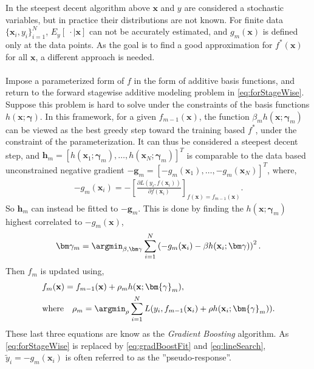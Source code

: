 In the steepest decent algorithm above $\mathbf{x}$ and $y$ are considered a stochastic variables, but in practice their distributions are not known. For finite data $\{\mathbf{x}_i, y_i\}_{i = 1}^{N}$, $E_y \left[\: \cdot \mid \mathbf{x} \right]$ can not be accurately estimated, and $g_m(\mathbf{x})$ is defined only at the data points. As the goal is to find a good approximation for $f^*(\mathbf{x})$ for all $\mathbf{x}$, a different approach is needed. 
\\
\\
Impose a parameterized form of $f$ in the form of additive basis functions, and return to the forward stagewise additive modeling problem in \eqref{eq:forStageWise}. Suppose this problem is hard to solve under the constraints of the basis functions $h(\mathbf{x}; \bm \gamma)$.
In this framework, for a given $f_{m-1}(\mathbf{x})$, the function $\beta_m h(\mathbf{x}; \bm{\gamma}_m)$ can be viewed as the best greedy step toward the training based $f^*$, under the constraint of the parameterization. It can thus be considered a steepest decent step, and $\mathbf{h}_m = [h(\mathbf{x}_1; \bm\gamma_m), \ldots, h(\mathbf{x}_N; \bm\gamma_m)]^T$ is comparable to the data based unconstrained negative gradient $-\mathbf{g}_m = [-g_m(\mathbf{x}_1), \ldots, -g_m(\mathbf{x}_N)]^T$, where,
\begin{align}
  -g_{m}(\mathbf{x}_i) = -\left[ \frac{\partial L(y_i, f(\mathbf{x}_i)) }{\partial f(\mathbf{x}_i)} \right]_{f(\mathbf{x}) = f_{m-1}(\mathbf{x})}.
\end{align}
So $ \mathbf{h}_m$ can instead be fitted to $-\mathbf{g}_m$. This is done by finding the $h(\mathbf{x}; \bm{\gamma}_m)$ highest correlated to $-g_m(\mathbf{x})$,
\begin{align}
  \label{eq:gradBoostFit} 
  \bm \gamma_m = \argmin_{\beta, \bm \gamma} \sum^{N}_{i=1} \left( -g_m(\mathbf{x}_i) - \beta h(\mathbf{x}_i; \bm \gamma) \right)^2.
\end{align}
Then $f_m$ is updated using,
\begin{align}
  &f_m(\mathbf{x}) = f_{m-1}(\mathbf{x}) + \rho_m h(\mathbf{x}; \bm{\gamma}_{m}),\\
  \label{eq:lineSearch} 
  &\text{where} \quad \rho_m = \argmin_\rho \sum^{N}_{i=1} L(y_i, f_{m-1}(\mathbf{x}_i) + \rho h(\mathbf{x}_i; \bm{\gamma}_m)).
\end{align}
These last three equations are know as the \textit{Gradient Boosting} algorithm.
As \eqref{eq:forStageWise} is replaced by \eqref{eq:gradBoostFit} and \eqref{eq:lineSearch}, $\tilde{y}_i = -g_m(\mathbf{x}_i)$ is often referred to as the ''pseudo-response''. 

